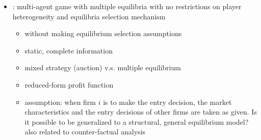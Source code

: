 \documentclass[a4paper]{article}
\begin{document}
\begin{itemize}
\item \cite{ciliberto2009market}: multi-agent game with multiple equilibria with no restrictions on player heterogeneity and equilibria selection mechanism
\begin{itemize}
\item without making equilibrium selection assumptions
\item static, complete information
\item mixed strategy (auction) v.s. multiple equilibrium 
\item reduced-form profit function
\item assumption: when firm $i$ is to make the entry decision, the market characteristics and the entry decisions of other firms are taken as given. Is it possible to be generalized to a structural, general equilibrium model? also related to counter-factual analysis
\end{itemize}

\end{itemize}



\end{document}
